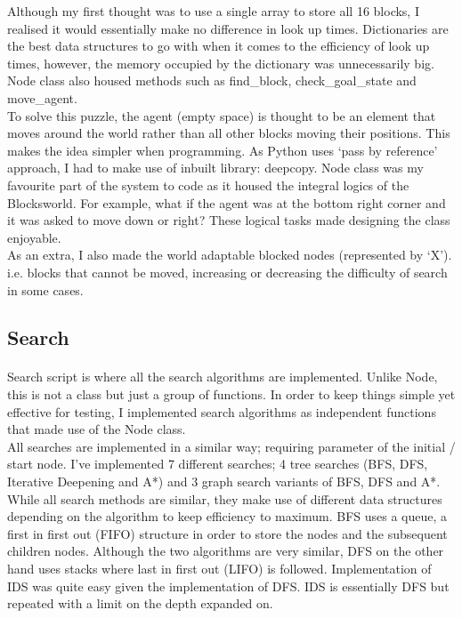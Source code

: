 \documentclass[10pt]{article}
\begin{document}
  Although my first thought was to use a single array to store all 16 blocks, I realised it would essentially make no difference in look up times. Dictionaries are the best data structures to go with when it comes to the efficiency of look up times, however, the memory occupied by the dictionary was unnecessarily big. Node class also housed methods such as find\_block, check\_goal\_state and move\_agent.\\

  To solve this puzzle, the agent (empty space) is thought to be an element that moves around the world rather than all other blocks moving their positions. This makes the idea simpler when programming. As Python uses `pass by reference' approach, I had to make use of inbuilt library: deepcopy. Node class was my favourite part of the system to code as it housed the integral logics of the Blocksworld. For example, what if the agent was at the bottom right corner and it was asked to move down or right? These logical tasks made designing the class enjoyable.\\

  As an extra, I also made the world adaptable blocked nodes (represented by `X'). i.e. blocks that cannot be moved, increasing or decreasing the difficulty of search in some cases. 


  \subsection{Search}
  \paragraph{} \indent
  Search script is where all the search algorithms are implemented. Unlike Node, this is not a class but just a group of functions. In order to keep things simple yet effective for testing, I implemented search algorithms as independent functions that made use of the Node class. \\
  
  All searches are implemented in a similar way; requiring parameter of the initial / start node. I’ve implemented 7 different searches; 4 tree searches (BFS, DFS, Iterative Deepening and A*) and 3 graph search variants of BFS, DFS and A*. \\

  While all search methods are similar, they make use of different data structures depending on the algorithm to keep efficiency to maximum. BFS uses a queue, a first in first out (FIFO) structure in order to store the nodes and the subsequent children nodes. Although the two algorithms are very similar, DFS on the other hand uses stacks where last in first out (LIFO) is followed. Implementation of IDS was quite easy given the implementation of DFS. IDS is essentially DFS but repeated with a limit on the depth expanded on. \\
\end{document}
